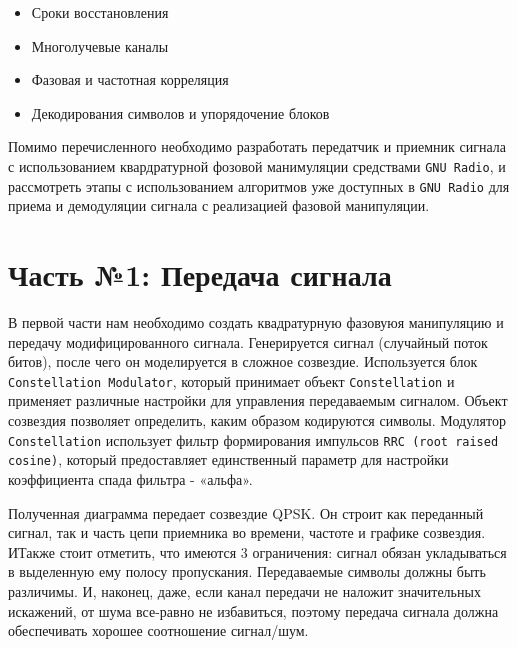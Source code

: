 \documentclass[a4paper]{article}
\begin{document}
            \begin{itemize}
                \item Сроки восстановления
                \item Многолучевые каналы
                \item Фазовая и частотная корреляция
                \item Декодирования символов и упорядочение блоков
            \end{itemize}
            
            Помимо перечисленного необходимо разработать передатчик и приемник сигнала с  использованием квардратурной фозовой манимуляции средствами \texttt{GNU Radio}, и рассмотреть этапы с использованием алгоритмов уже доступных в \texttt{GNU Radio} для приема и демодуляции сигнала с реализацией фазовой манипуляции.
            
    \newpage
        \section{Часть №1: Передача сигнала}
           В первой части нам необходимо создать квадратурную фазовуюя манипуляцию и передачу модифицированного сигнала. Генерируется сигнал (случайный поток битов), после чего он моделируется в сложное созвездие. Используется блок \texttt{Constellation Modulator}, который принимает объект \texttt{Constellation} и применяет различные настройки для управления передаваемым сигналом. Объект созвездия позволяет определить, каким образом кодируются символы. Модулятор \texttt{Constellation} использует фильтр формирования импульсов \texttt{RRC (root raised cosine)}, который предоставляет единственный параметр для настройки коэффициента спада фильтра - «альфа».
           
           Полученная диаграмма передает созвездие QPSK. Он строит как переданный сигнал, так и часть цепи приемника во времени, частоте и графике созвездия. ИТакже стоит отметить, что имеются 3 ограничения: сигнал обязан укладываться в выделенную ему полосу пропускания. Передаваемые символы должны быть различимы. И, наконец, даже, если канал передачи не наложит значительных искажений, от шума все-равно не избавиться, поэтому передача сигнала должна обеспечивать хорошее соотношение сигнал/шум.
           
\end{document}
